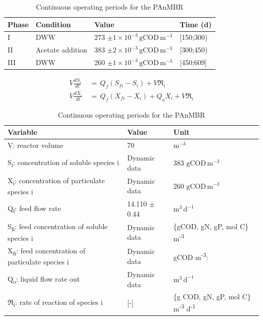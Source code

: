 \begin{table}[tp]
    \centering
    \small
    \renewcommand{\arraystretch}{1.4}
    \caption{Continuous operating periods for the PAnMBR}
    \tabcolsep=0.11cm
    \begin{tabular}{@{}p{2cm} p{4cm} p{5cm} p{2cm}@{}} \toprule
        Phase & Condition & Value & Time (d) \\ 
        \hline
        I & DWW & 273 $\mathrm{\pm 1 \times 10^{-3}\, gCOD\, m^{-3}}$ & [150;300)\\
        II & Acetate addition & 383 $\mathrm{\pm 2 \times 10^{-3}\, gCOD\, m^{-3}}$ & [300;450)\\
        III & DWW & 260 $\mathrm{\pm 1 \times 10^{-3}\, gCOD\, m^{-3}}$ & [450;609]\\
        \bottomrule
    \end{tabular}
    \label{tab:cont}
\end{table}

\begin{align}
    V \frac{dS_i}{dt} \, &= \, Q_f (S_{fi} - S_i) + V \mathfrak{R}_i  \nonumber \\
    V \frac{dX_i}{dt}\, &= \, Q_f (X_{fi} - X_i) + Q_o X_i + V \mathfrak{R}_i
    \label{eq:cont}
\end{align}

\begin{table}[tp]
    \centering
    \small
    \renewcommand{\arraystretch}{1.4}
    \caption{Continuous operating periods for the PAnMBR}
    \tabcolsep=0.11cm
    \begin{tabular}{@{}p{7cm} p{4cm} p{5cm}@{}} \toprule
        Variable  & Value & Unit \\ 
        \hline
        V: reactor volume & $\mathrm{70}$ & $ \mathrm{m^{-3}}$ \\
        S\textsubscript{i}: concentration of soluble species i & Dynamic data & 383 $\mathrm{gCOD\, m^{-3}}$ \\
        X\textsubscript{i}: concentration of particulate species i & Dynamic data & 260 $\mathrm{gCOD\, m^{-3}}$ \\
        Q\textsubscript{f}: feed flow rate  & 14.110 $\pm$ 0.44 & $\mathrm{m^3\, d^{-1}}$\\
        S\textsubscript{fi}: feed concentration of soluble species i & Dynamic data & \{gCOD, gN, gP, mol C\} m\textsuperscript{-3}\\
        X\textsubscript{fi}: feed concentration of particulate species i & Dynamic data & gCOD m\textsuperscript{-3}: \\
        Q\textsubscript{o}: liquid flow rate out & Dynamic data&  $\mathrm{m^3\, d^{-1}}$\\
        $\mathfrak{R}$\textsubscript{i}: rate of reaction of species i & [-] & \{g COD, gN, gP, mol C\} m\textsuperscript{-3} d\textsuperscript{-1} \\
        \bottomrule
    \end{tabular}
    \label{tab:cont_op_conditions}
\end{table}




